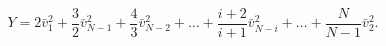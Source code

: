 \begin{equation}
Y=2\bar v_1^2 +\frac{3}{2} \bar v_{N-1}^2 +\frac{4}{3} \bar v_{N-2}^2
+\dots +\frac{i+2}{i+1} \bar v_{N-i}^2 +\dots + \frac{N}{N-1} \bar
v_2^2. \label{B9}
\end{equation}

